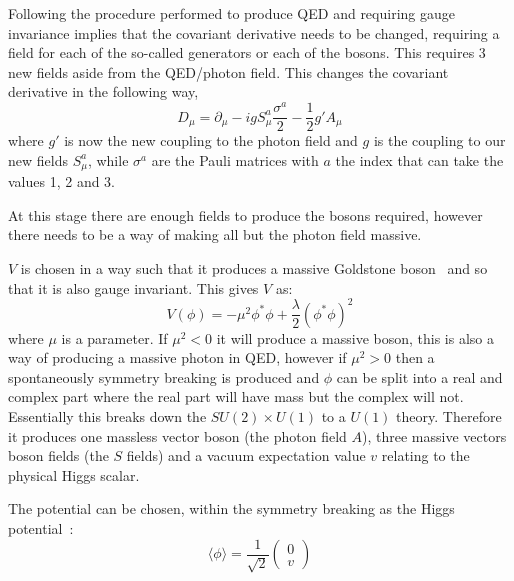 Following the procedure performed to produce QED and requiring gauge invariance implies that the covariant derivative needs to be changed, requiring a field for each of the so-called generators or each of the bosons. This requires 3 new fields aside from the QED/photon field. This changes the covariant derivative in the following way,
\begin{equation}
D_\mu = \partial_\mu - ig S^a_\mu \frac{\sigma^a}{2} - \frac{1}{2}g' A_\mu
\end{equation}
where $g'$ is now the new coupling to the photon field and $g$ is the coupling to our new fields $S^a_\mu$, while $\sigma^a$ are the Pauli matrices with $a$ the index that can take the values 1, 2 and 3.

At this stage there are enough fields to produce the bosons required, however there needs to be a way of making all but the photon field massive.

$V$ is chosen in a way such that it produces a massive Goldstone boson~\cite{80Goldstone} and so that it is also gauge invariant. This gives $V$ as:
\begin{equation}
V(\phi) = - \mu^2 \phi^{*}\phi + \frac{\lambda}{2}(\phi^{*}\phi)^2
\end{equation}
where $\mu$ is a parameter.
If $\mu^2 <0$ it will produce a massive boson, this is also a way of producing a massive photon in QED, however if $\mu^2 >0$ then a spontaneously symmetry breaking is produced and $\phi$ can be split into a real and complex part where the real part will have mass but the complex will not. Essentially this breaks down the $SU(2) \times U(1)$ to a $U(1)$ theory. Therefore it produces one massless vector boson (the photon field $A$), three massive vectors boson fields (the $S$ fields) and a vacuum expectation value $v$ relating to the physical Higgs scalar.

The potential can be chosen, within the symmetry breaking as the Higgs potential~\cite{35Higgs}:
\begin{equation}
\langle \phi \rangle = \frac{1}{\sqrt{2}}
\begin{pmatrix}
    0\\
    v
\end{pmatrix}
\end{equation}


